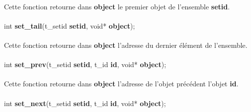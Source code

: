 \documentclass[10pt,a4wide]{article}
\begin{document}
\paragraph{}

Cette fonction retourne dans \textbf{object} le premier objet de
l'ensemble \textbf{setid}.

\paragraph{}

\hspace{1.5cm}int \textbf{set\_tail}(t\_setid \textbf{setid},
                                     void* \textbf{object});

\paragraph{}

Cette fonction retourne dans \textbf{object} l'adresse du dernier
\'el\'ement de l'ensemble.

\paragraph{}

\hspace{1.5cm}int \textbf{set\_prev}(t\_setid \textbf{setid},
                                     t\_id \textbf{id},
                                     void* \textbf{object});

\paragraph{}

Cette fonction retourne dans \textbf{object} l'adresse de l'objet
pr\'ec\'edent l'objet \textbf{id}.

\paragraph{}

\hspace{1.5cm}int \textbf{set\_next}(t\_setid \textbf{setid},
                                     t\_id \textbf{id},
                                     void* \textbf{object});

\paragraph{}
\end{document}
